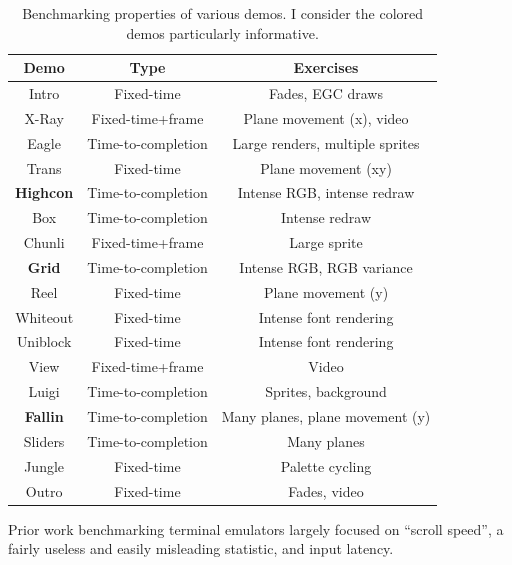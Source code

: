 \begin{table}[!htbp]
  \centering
  \begin{tabular}{ |c|c|c| }
    \hline
    Demo & Type & Exercises \\
    \hline
    \hline
    Intro & Fixed-time & Fades, EGC draws \\
    \hline
    X-Ray & Fixed-time+frame & Plane movement (x), video \\
    \hline
    Eagle & Time-to-completion & Large renders, multiple sprites \\
    \hline
    Trans & Fixed-time & Plane movement (xy) \\
    \hline
    \rowcolor{blue!25}
    \textbf{Highcon} & Time-to-completion & Intense RGB, intense redraw \\
    \hline
    Box & Time-to-completion & Intense redraw \\
    \hline
    Chunli & Fixed-time+frame & Large sprite \\
    \hline
    \rowcolor{blue!25}
    \textbf{Grid} & Time-to-completion & Intense RGB, RGB variance \\
    \hline
    Reel & Fixed-time & Plane movement (y) \\
    \hline
    Whiteout & Fixed-time & Intense font rendering \\
    \hline
    Uniblock & Fixed-time & Intense font rendering \\
    \hline
    View & Fixed-time+frame & Video \\
    \hline
    Luigi & Time-to-completion & Sprites, background \\
    \hline
    \rowcolor{blue!25}
    \textbf{Fallin} & Time-to-completion & Many planes, plane movement (y) \\
    \hline
    Sliders & Time-to-completion & Many planes \\
    \hline
    Jungle & Fixed-time & Palette cycling \\
    \hline
    Outro & Fixed-time & Fades, video \\
    \hline
  \end{tabular}
\caption[Benchmarking properties of various demos.]{Benchmarking properties of
  various demos. I consider the colored demos particularly informative.}
\label{table:benchmarks}
\end{table}

Prior work benchmarking terminal emulators largely focused on ``scroll speed'',
a fairly useless and easily misleading statistic\cite{lookatterms}, and input
latency\cite{typingpleasure}.

